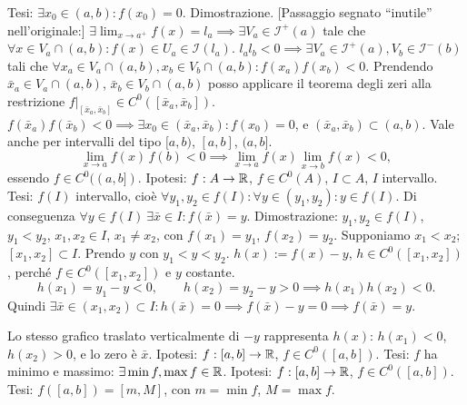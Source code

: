 Tesi: $\exists x_0\in(a,b):f(x_0)=0$.
Dimostrazione. [Passaggio segnato ``inutile'' nell'originale:] $\exists\lim_{x\to a^+}f(x)=l_a\implies\exists V_a\in\mathcal I^+(a)$ tale che $\forall x\in V_a\cap(a,b):f(x)\in U_a\in\mathcal I(l_a)$.
$l_al_b<0\implies\exists V_a\in\mathcal I^+(a),V_b\in\mathcal I^-(b)$ tali che $\forall x_a\in V_a\cap(a,b),x_b\in V_b\cap(a,b):f(x_a)f(x_b)<0$.
Prendendo $\bar x_a\in V_a\cap(a,b)$, $\bar x_b\in V_b\cap(a,b)$ posso applicare il teorema degli zeri alla restrizione $f|_{[\bar x_a,\bar x_b]}\in C^0([\bar x_a,\bar x_b])$.
$f(\bar x_a)f(\bar x_b)<0\implies\exists x_0\in(\bar x_a,\bar x_b):f(x_0)=0$, e $(\bar x_a,\bar x_b)\subset(a,b)$.
Vale anche per intervalli del tipo $[a,b)$, $[a,b]$, $(a,b]$.
\[\lim_{x\to a}f(x)\,f(b)<0\implies\lim_{x\to a}f(x)\lim_{x\to b}f(x)<0,\]
essendo $f\in C^0((a,b])$.
Ipotesi: $f:A\to\mathbb R$, $f\in C^0(A)$, $I\subset A$, $I$ intervallo.
Tesi: $f(I)$ intervallo, cioè $\forall y_1,y_2\in f(I):\forall y\in(y_1,y_2):y\in f(I)$.
Di conseguenza $\forall y\in f(I)\ \exists\bar x\in I:f(\bar x)=y$.
Dimostrazione: $y_1,y_2\in f(I)$, $y_1<y_2$, $x_1,x_2\in I$, $x_1\ne x_2$, con $f(x_1)=y_1$, $f(x_2)=y_2$.
Supponiamo $x_1<x_2$; $[x_1,x_2]\subset I$. Prendo $y$ con $y_1<y<y_2$.
$h(x):=f(x)-y$, $h\in C^0([x_1,x_2])$, perché $f\in C^0([x_1,x_2])$ e $y$ costante.
\[h(x_1)=y_1-y<0,\qquad h(x_2)=y_2-y>0\implies h(x_1)h(x_2)<0.\]
Quindi $\exists\bar x\in(x_1,x_2)\subset I:h(\bar x)=0\implies f(\bar x)-y=0\implies f(\bar x)=y$.
\begin{center}\end{center}
Lo stesso grafico traslato verticalmente di $-y$ rappresenta $h(x)$: $h(x_1)<0$, $h(x_2)>0$, e lo zero è $\bar x$.
Ipotesi: $f:[a,b]\to\mathbb R$, $f\in C^0([a,b])$.
Tesi: $f$ ha minimo e massimo: $\exists\min f,\max f\in\mathbb R$.
Ipotesi: $f:[a,b]\to\mathbb R$, $f\in C^0([a,b])$.
Tesi: $f([a,b])=[m,M]$, con $m=\min f$, $M=\max f$.
